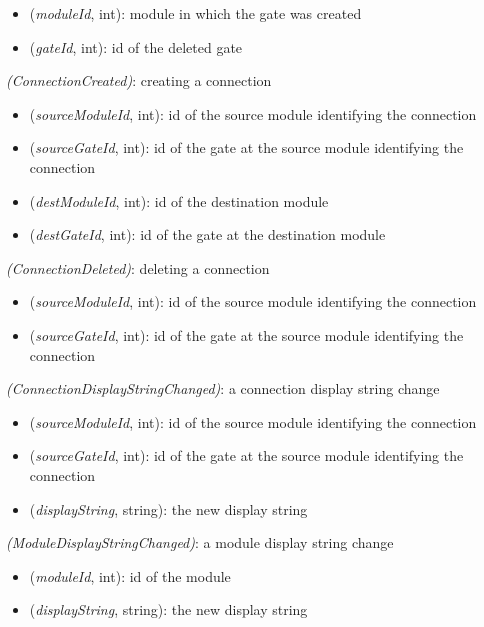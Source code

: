 \begin{itemize}
  \item {} (\textit{moduleId}, int): module in which the gate was created
  \item {} (\textit{gateId}, int): id of the deleted gate
\end{itemize}

 \textit{(ConnectionCreated)}: creating a connection

\begin{itemize}
  \item {} (\textit{sourceModuleId}, int): id of the source module identifying the connection
  \item {} (\textit{sourceGateId}, int): id of the gate at the source module identifying the connection
  \item {} (\textit{destModuleId}, int): id of the destination module
  \item {} (\textit{destGateId}, int): id of the gate at the destination module
\end{itemize}

 \textit{(ConnectionDeleted)}: deleting a connection

\begin{itemize}
  \item {} (\textit{sourceModuleId}, int): id of the source module identifying the connection
  \item {} (\textit{sourceGateId}, int): id of the gate at the source module identifying the connection
\end{itemize}

 \textit{(ConnectionDisplayStringChanged)}: a connection display string change

\begin{itemize}
  \item {} (\textit{sourceModuleId}, int): id of the source module identifying the connection
  \item {} (\textit{sourceGateId}, int): id of the gate at the source module identifying the connection
  \item {} (\textit{displayString}, string): the new display string
\end{itemize}

 \textit{(ModuleDisplayStringChanged)}: a module display string change

\begin{itemize}
  \item {} (\textit{moduleId}, int): id of the module
  \item {} (\textit{displayString}, string): the new display string
\end{itemize}

